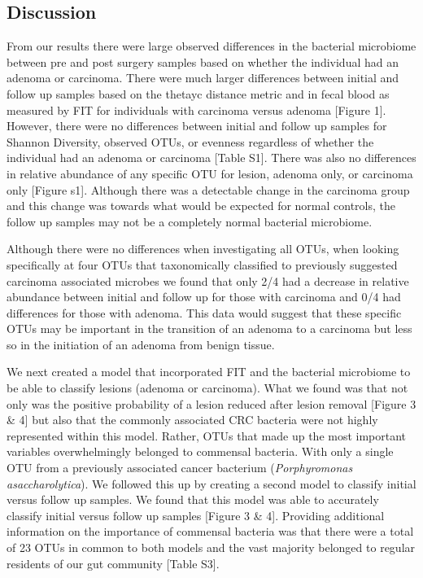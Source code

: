 \documentclass[12pt,]{article}
\begin{document}
\newpage

\subsection{Discussion}\label{discussion}

From our results there were large observed differences in the bacterial
microbiome between pre and post surgery samples based on whether the
individual had an adenoma or carcinoma. There were much larger
differences between initial and follow up samples based on the thetayc
distance metric and in fecal blood as measured by FIT for individuals
with carcinoma versus adenoma {[}Figure 1{]}. However, there were no
differences between initial and follow up samples for Shannon Diversity,
observed OTUs, or evenness regardless of whether the individual had an
adenoma or carcinoma {[}Table S1{]}. There was also no differences in
relative abundance of any specific OTU for lesion, adenoma only, or
carcinoma only {[}Figure s1{]}. Although there was a detectable change
in the carcinoma group and this change was towards what would be
expected for normal controls, the follow up samples may not be a
completely normal bacterial microbiome.

Although there were no differences when investigating all OTUs, when
looking specifically at four OTUs that taxonomically classified to
previously suggested carcinoma associated microbes we found that only
2/4 had a decrease in relative abundance between initial and follow up
for those with carcinoma and 0/4 had differences for those with adenoma.
This data would suggest that these specific OTUs may be important in the
transition of an adenoma to a carcinoma but less so in the initiation of
an adenoma from benign tissue.

We next created a model that incorporated FIT and the bacterial
microbiome to be able to classify lesions (adenoma or carcinoma). What
we found was that not only was the positive probability of a lesion
reduced after lesion removal {[}Figure 3 \& 4{]} but also that the
commonly associated CRC bacteria were not highly represented within this
model. Rather, OTUs that made up the most important variables
overwhelmingly belonged to commensal bacteria. With only a single OTU
from a previously associated cancer bacterium (\emph{Porphyromonas
asaccharolytica}). We followed this up by creating a second model to
classify initial versus follow up samples. We found that this model was
able to accurately classify initial versus follow up samples {[}Figure 3
\& 4{]}. Providing additional information on the importance of commensal
bacteria was that there were a total of 23 OTUs in common to both models
and the vast majority belonged to regular residents of our gut community
{[}Table S3{]}.
\end{document}
